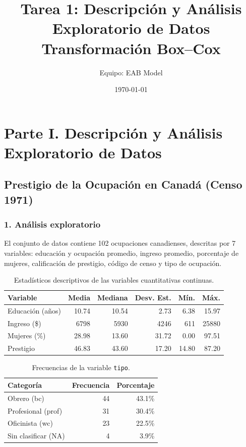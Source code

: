 \documentclass[11pt]{article}
\title{\textbf{Tarea 1: Descripción y Análisis Exploratorio de Datos\\ Transformación Box--Cox}}
\author{Equipo: EAB Model}
\date{\today}
\begin{document}
\maketitle
\thispagestyle{empty}

\section*{Parte I. Descripción y Análisis Exploratorio de Datos}
\subsection*{Prestigio de la Ocupación en Canadá (Censo 1971)}

\subsubsection*{1. Análisis exploratorio}

El conjunto de datos contiene 102 ocupaciones canadienses, descritas por 7 variables: educación y ocupación promedio, ingreso promedio, porcentaje de mujeres, calificación de prestigio, código de censo y tipo de ocupación.

\begin{table}[H]
\centering
\caption{Estadísticos descriptivos de las variables cuantitativas continuas.}
\begin{tabular}{lrrrrr}
\toprule
Variable & Media & Mediana & Desv. Est. & Mín. & Máx. \\
\midrule
Educación (años) & 10.74 & 10.54 & 2.73 & 6.38 & 15.97 \\
Ingreso (\$) & 6798 & 5930 & 4246 & 611 & 25880 \\
Mujeres (\%) & 28.98 & 13.60 & 31.72 & 0.00 & 97.51 \\
Prestigio & 46.83 & 43.60 & 17.20 & 14.80 & 87.20 \\
\bottomrule
\end{tabular}
\end{table}

\begin{table}[H]
\centering
\caption{Frecuencias de la variable \texttt{tipo}.}
\begin{tabular}{lrr}
\toprule
Categoría & Frecuencia & Porcentaje \\
\midrule
Obrero (bc) & 44 & 43.1\% \\
Profesional (prof) & 31 & 30.4\% \\
Oficinista (wc) & 23 & 22.5\% \\
Sin clasificar (NA) & 4 & 3.9\% \\
\bottomrule
\end{tabular}
\end{table}
\end{document}
